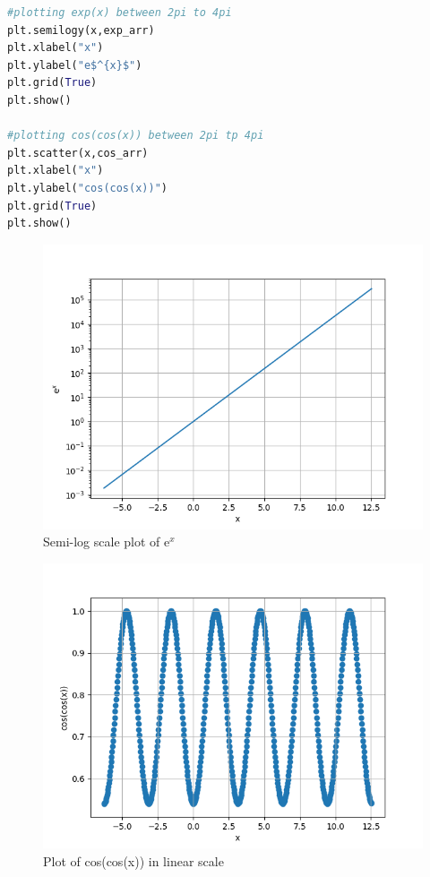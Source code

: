 \documentclass[a4paper]{article}
\begin{document}
\begin{lstlisting}[language=Python ,caption=Plotting the functions]
#plotting exp(x) between 2pi to 4pi
plt.semilogy(x,exp_arr)
plt.xlabel("x")
plt.ylabel("e$^{x}$")
plt.grid(True)
plt.show()

#plotting cos(cos(x)) between 2pi tp 4pi
plt.scatter(x,cos_arr)
plt.xlabel("x")
plt.ylabel("cos(cos(x))")
plt.grid(True)
plt.show()

\end{lstlisting}
\begin{figure}
\includegraphics[width=\columnwidth]{expsl.png}
\caption{Semi-log scale plot of e$^{x}$}
\end{figure}
\begin{figure}
\includegraphics[width=\columnwidth]{coscossl.png}
\caption{Plot of cos(cos(x)) in linear scale}
\end{figure}
\end{document}
